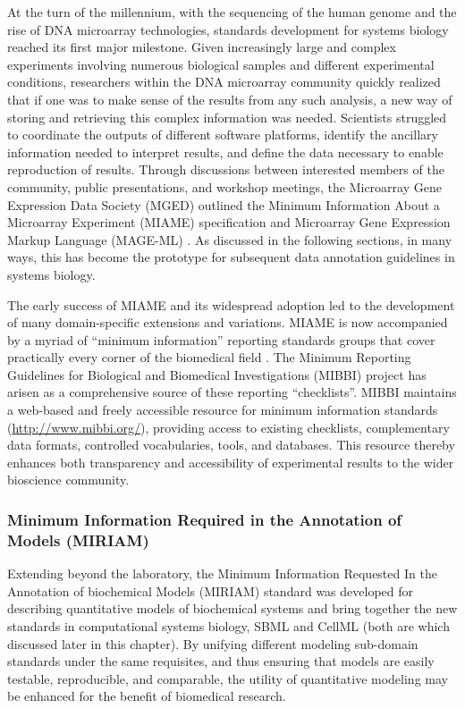 At the turn of the millennium, with the sequencing of the human genome
and the rise of DNA microarray technologies, standards development for
systems biology reached its first major milestone. Given increasingly
large and complex experiments involving numerous biological samples and
different experimental conditions, researchers within the DNA microarray
community quickly realized that if one was to make sense of the results
from any such analysis, a new way of storing and retrieving this complex
information was needed. Scientists struggled to coordinate the outputs
of different software platforms, identify the ancillary information
needed to interpret results, and define the data necessary to enable
reproduction of results. Through discussions between interested members
of the community, public presentations, and workshop meetings, the
Microarray Gene Expression Data Society (MGED) outlined the Minimum
Information About a Microarray Experiment (MIAME) specification
\autocite{brazma2001minimum} and Microarray Gene Expression Markup
Language (MAGE-ML) \autocite{spellman2002design}. As discussed in
the following sections, in many ways, this has become the prototype
\autocite{quackenbush2006standardizing} for subsequent data annotation
guidelines in systems biology.

The early success of MIAME and its widespread adoption led to the
development of many domain-specific extensions and variations. MIAME is
now accompanied by a myriad of ``minimum information'' reporting
standards groups that cover practically every corner of the biomedical
field \autocite{naturebiotechnology2006}. The Minimum Reporting
Guidelines for Biological and Biomedical Investigations (MIBBI)
\autocite{taylor2008promoting} project has arisen as a comprehensive
source of these reporting ``checklists''. MIBBI maintains a web-based
and freely accessible resource for minimum information standards
(\url{http://www.mibbi.org/}), providing access to existing checklists,
complementary data formats, controlled vocabularies, tools, and
databases. This resource thereby enhances both transparency and
accessibility of experimental results to the wider bioscience community.

\subsubsection{Minimum Information Required in the Annotation of Models
(MIRIAM)}

Extending beyond the laboratory, the Minimum Information Requested In
the Annotation of biochemical Models (MIRIAM) standard
\autocite{novere2005minimum} \autocite{le2006model} was developed for
describing quantitative models of biochemical systems and bring together
the new standards in computational systems biology, SBML and CellML
(both are which discussed later in this chapter). By unifying different
modeling sub-domain standards under the same requisites, and thus
ensuring that models are easily testable, reproducible, and comparable,
the utility of quantitative modeling may be enhanced for the benefit of
biomedical research.


